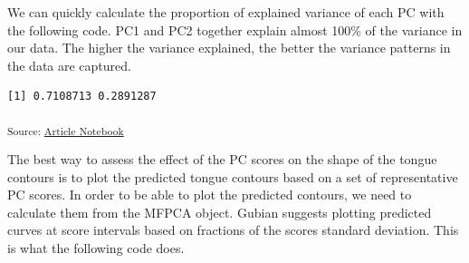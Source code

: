 \documentclass[
]{interact}
\newenvironment{Shaded}{\begin{snugshade}}{\end{snugshade}}
\newcommand{\CommentTok}[1]{\textcolor[rgb]{0.37,0.37,0.37}{#1}}
\newcommand{\FunctionTok}[1]{\textcolor[rgb]{0.28,0.35,0.67}{#1}}
\newcommand{\NormalTok}[1]{\textcolor[rgb]{0.00,0.23,0.31}{#1}}
\newcommand{\SpecialCharTok}[1]{\textcolor[rgb]{0.37,0.37,0.37}{#1}}
\begin{document}
We can quickly calculate the proportion of explained variance of each PC
with the following code. PC1 and PC2 together explain almost 100\% of
the variance in our data. The higher the variance explained, the better
the variance patterns in the data are captured.

\begin{Shaded}
\end{Shaded}

\begin{verbatim}
[1] 0.7108713 0.2891287
\end{verbatim}

\textsubscript{Source:
\href{https://stefanocoretta.github.io/mv_uti/index.qmd.html}{Article
Notebook}}

The best way to assess the effect of the PC scores on the shape of the
tongue contours is to plot the predicted tongue contours based on a set
of representative PC scores. In order to be able to plot the predicted
contours, we need to calculate them from the MFPCA object. Gubian
suggests plotting predicted curves at score intervals based on fractions
of the scores standard deviation. This is what the following code does.
\end{document}
